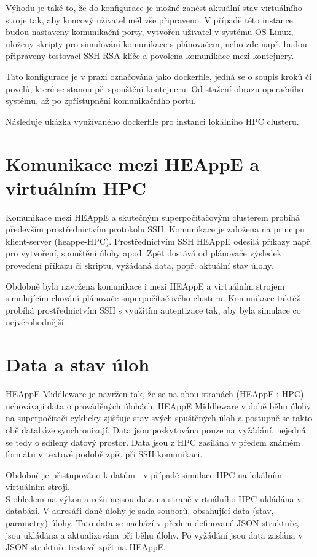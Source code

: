 Výhodu je také to, že do konfigurace je možné zanést aktuální stav virtuálního stroje tak, aby koncový uživatel měl vše připraveno. V případě této instance budou nastaveny komunikační porty, vytvořen uživatel v systému OS Linux, uloženy skripty pro simulování komunikace s plánovačem, nebo zde např. budou připraveny testovací SSH-RSA klíče a povolena komunikace mezi kontejnery.

Tato konfigurace je v praxi označována jako dockerfile, jedná se o soupis kroků či povelů, které se stanou při spouštění kontejneru. Od stažení obrazu operačního systému, až po zpřístupnění komunikačního portu.

Následuje ukázka využívaného dockerfile pro instanci lokálního HPC clusteru.

\hfill \break


\section{Komunikace mezi HEAppE a virtuálním HPC}
Komunikace mezi HEAppE a skutečným superpočítačovým clusterem probíhá především prostřednictvím protokolu SSH. Komunikace je založena na principu klient-server (heappe-HPC). Prostřednictvím SSH HEAppE odesílá příkazy např. pro vytvoření, spouštění úlohy apod. Zpět dostává od plánovače výsledek provedení příkazu či skriptu, vyžádaná data, popř. aktuální stav úlohy.

Obdobně byla navržena komunikace i mezi HEAppE a virtuálním strojem simulujícím chování plánovače superpočítačového clusteru. Komunikace taktéž probíhá prostřednictvím SSH s využitím autentizace tak, aby byla simulace co nejvěrohodnější.

\section{Data a stav úloh}
HEAppE Middleware je navržen tak, že se na obou stranách (HEAppE i HPC) uchovávají data o prováděných úlohách. HEAppE Middleware v době běhu úlohy na superpočítači cyklicky zjišťuje stav svých spuštěných úloh a postupně se takto obě databáze synchronizují. Data jsou poskytována pouze na vyžádání, nejedná se tedy o sdílený datový prostor. Data jsou z HPC zasílána v předem známém formátu v textové podobě zpět při SSH komunikaci.

Obdobně je přistupováno k datům i v případě simulace HPC na lokálním virtuálním stroji. \\S ohledem na výkon a režii nejsou data na straně virtuálního HPC ukládána v databázi. V adresáři dané úlohy je sada souborů, obsahující data (stav, parametry) úlohy. Tato data se nachází v předem definované JSON struktuře, jsou ukládána a aktualizována při běhu úlohy. Po vyžádání jsou data zaslána v JSON struktuře textově zpět na HEAppE.

